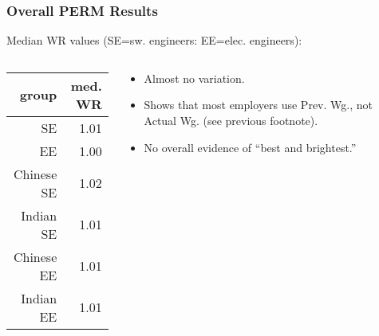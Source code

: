 \documentclass{beamer}
\begin{document}
\begin{frame}
\frametitle{Overall PERM Results}

Median WR values (SE=sw. engineers: EE=elec. engineers):

\medskip

\begin{columns}

  \begin{column}{0.5\textwidth}
  \begin{tabular}{|r|r|}
  \hline
  group & med. WR \\ \hline 
  \hline
  SE & 1.01 \\ \hline 
  EE & 1.00 \\ \hline 
  Chinese SE & 1.02 \\ \hline 
  Indian SE & 1.01 \\ \hline 
  Chinese EE & 1.01 \\ \hline 
  Indian EE & 1.01 \\ \hline 
  \end{tabular}
  \end{column}
  \pause

  \begin{column}{0.5\textwidth}

  \begin{itemize}

  \item Almost no variation.
  \pause

  \item Shows that most employers use Prev. Wg., not Actual Wg.
  (see previous footnote).
  \pause
  
  \item No overall evidence of ``best and brightest.''

  \end{itemize}
  
  \end{column}

\end{columns}

\end{frame}
\end{document}
